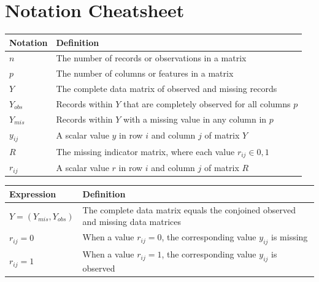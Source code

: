 \documentclass[12pt,oneside]{chicagocapstone}
\begin{document}
\chapter{Notation Cheatsheet}\label{notation-cheatsheet}
\begin{longtable}[]{@{}ll@{}}
\toprule
Notation & Definition\tabularnewline
\midrule
\endhead
\(n\) & The number of records or observations in a matrix\tabularnewline
\(p\) & The number of columns or features in a matrix\tabularnewline
\(Y\) & The complete data matrix of observed and missing
records\tabularnewline
\(Y_{obs}\) & Records within \(Y\) that are completely observed for all
columns \(p\)\tabularnewline
\(Y_{mis}\) & Records within \(Y\) with a missing value in any column in
\(p\)\tabularnewline
\(y_{ij}\) & A scalar value \(y\) in row \(i\) and column \(j\) of
matrix \(Y\)\tabularnewline
\(R\) & The missing indicator matrix, where each value
\(r_{ij} \in 0,1\)\tabularnewline
\(r_{ij}\) & A scalar value \(r\) in row \(i\) and column \(j\) of
matrix \(R\)\tabularnewline
\bottomrule
\end{longtable}
\begin{longtable}[]{@{}ll@{}}
\toprule
\begin{minipage}[b]{0.22\columnwidth}\raggedright\strut
Expression\strut
\end{minipage} & \begin{minipage}[b]{0.72\columnwidth}\raggedright\strut
Definition\strut
\end{minipage}\tabularnewline
\midrule
\endhead
\begin{minipage}[t]{0.22\columnwidth}\raggedright\strut
\(Y = (Y_{mis}, Y_{obs})\)\strut
\end{minipage} & \begin{minipage}[t]{0.72\columnwidth}\raggedright\strut
The complete data matrix equals the conjoined observed and missing data
matrices\strut
\end{minipage}\tabularnewline
\begin{minipage}[t]{0.22\columnwidth}\raggedright\strut
\(r_{ij} = 0\)\strut
\end{minipage} & \begin{minipage}[t]{0.72\columnwidth}\raggedright\strut
When a value \(r_{ij}=0\), the corresponding value \(y_{ij}\) is
missing\strut
\end{minipage}\tabularnewline
\begin{minipage}[t]{0.22\columnwidth}\raggedright\strut
\(r_{ij}=1\)\strut
\end{minipage} & \begin{minipage}[t]{0.72\columnwidth}\raggedright\strut
When a value \(r_{ij}=1\), the corresponding value \(y_{ij}\) is
observed\strut
\end{minipage}\tabularnewline
\bottomrule
\end{longtable}
\end{document}
